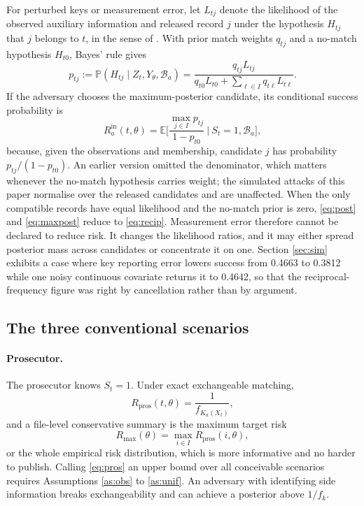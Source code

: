 \documentclass[11pt,a4paper]{article}
\theoremstyle{plain}
\theoremstyle{definition}
\theoremstyle{definition}
\theoremstyle{plain}
\newcommand{\Prob}{\mathbb{P}}
\newcommand{\E}{\mathbb{E}}
\begin{document}
For perturbed keys or measurement error, let $L_{tj}$ denote the likelihood of
the observed auxiliary information and released record $j$ under the hypothesis
$H_{tj}$ that $j$ belongs to $t$, in the sense of \citet{fellegi1969}. With
prior match weights $q_{tj}$ and a no-match hypothesis $H_{t0}$, Bayes' rule
gives
\begin{equation}
p_{tj} := \Prob(H_{tj} \mid Z_t, Y_\theta, \mathcal{B}_a)
= \frac{q_{tj} L_{tj}}{q_{t0} L_{t0} + \sum_{\ell \in I} q_{t\ell} L_{t\ell}} .
\label{eq:post}
\end{equation}
If the adversary chooses the maximum-posterior candidate, its conditional
success probability is
\begin{equation}
R_a^{\mathrm{in}}(t, \theta) = \E\Big[ \frac{\max_{j \in I} p_{tj}}{1 - p_{t0}} \ \Big| \ S_t = 1,
\mathcal{B}_a \Big] ,
\label{eq:maxpost}
\end{equation}
because, given the observations and membership, candidate $j$ has probability
$p_{tj}/(1 - p_{t0})$. An earlier version omitted the denominator, which matters whenever the
no-match hypothesis carries weight; the simulated attacks of this paper normalise over the
released candidates and are unaffected.
When the only compatible records have equal likelihood and the no-match prior
is zero, \eqref{eq:post} and \eqref{eq:maxpost} reduce to \eqref{eq:recip}.
Measurement error therefore cannot be declared to reduce risk. It changes the
likelihood ratios, and it may either spread posterior mass across candidates or
concentrate it on one. Section \ref{sec:sim} exhibits a case where key
reporting error lowers success from 0.4663 to 0.3812 while one noisy continuous
covariate returns it to 0.4642, so that the reciprocal-frequency figure was
right by cancellation rather than by argument.

\subsection{The three conventional scenarios}\label{sec:three}

\paragraph{Prosecutor.}
The prosecutor knows $S_t = 1$. Under exact exchangeable matching,
\begin{equation}
R_{\mathrm{pros}}(t, \theta) = \frac{1}{f_{K_a(X_t)}} ,
\label{eq:pros}
\end{equation}
and a file-level conservative summary is the maximum target risk
\begin{equation}
R_{\max}(\theta) = \max_{i \in I} R_{\mathrm{pros}}(i, \theta) ,
\label{eq:max}
\end{equation}
or the whole empirical risk distribution, which is more informative and no
harder to publish. Calling \eqref{eq:pros} an upper bound over all conceivable
scenarios requires Assumptions \ref{as:obs} to \ref{as:unif}. An adversary with
identifying side information breaks exchangeability and can achieve a posterior
above $1/f_k$.
\end{document}

